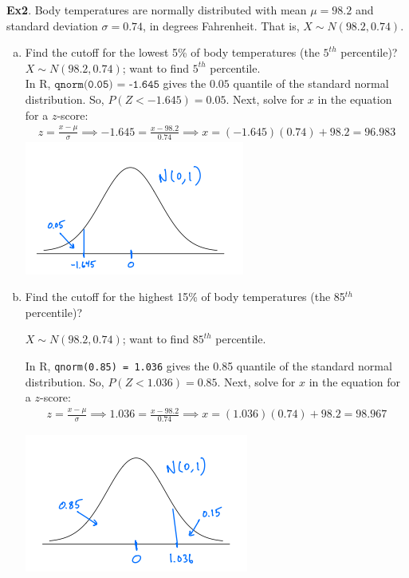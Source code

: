 \documentclass[fleqn, 11pt]{article}
\begin{document}
\textbf{Ex2}.  Body temperatures are normally distributed with mean $\mu=98.2$ and standard deviation $\sigma= 0.74$, in degrees Fahrenheit.  That is, $X \sim N(98.2, 0.74)$.  
\begin{enumerate}[(a)]
\item Find the cutoff for the lowest 5\% of body temperatures (the $5^{th}$ percentile)?\\

{\color{blue}
$X \sim N(98.2, 0.74)$; want to find $5^{th}$ percentile.\\

In R, $\texttt{qnorm(0.05) = -1.645}$ gives the $0.05$ quantile of the standard normal distribution.  So, $P(Z < -1.645) = 0.05$.  Next, solve for $x$ in the equation for a $z$-score:
\begin{align*}
z = \frac{x - \mu}{\sigma} \implies
-1.645 = \frac{x - 98.2}{0.74} \implies
x = (-1.645)(0.74) + 98.2 = \boxed{96.983}
\end{align*}
}
\includegraphics[scale=0.65]{figure/2a.png}
\bigskip

\item Find the cutoff for the highest 15\% of body temperatures (the 85$^{th}$ percentile)?\\

{\color{blue}
$X \sim N(98.2, 0.74)$; want to find $85^{th}$ percentile.
\medskip

In R, \texttt{qnorm(0.85) = 1.036} gives the 0.85 quantile of the standard normal distribution. So, $P(Z < 1.036) = 0.85$.  Next, solve for $x$ in the equation for a $z$-score:
\begin{align*}
z = \frac{x - \mu}{\sigma} \implies
1.036 = \frac{x - 98.2}{0.74} \implies
x = (1.036)(0.74) + 98.2 = \boxed{98.967}
\end{align*}
}

\includegraphics[scale=0.67]{figure/2b.png}
\end{enumerate}
  





 
\end{document}
